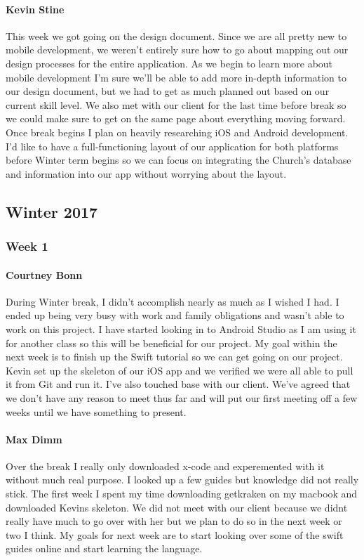 \documentclass[letterpaper,10pt,draftclsnofoot,onecolumn,titlepage]{IEEEtran}
\begin{document}
			\paragraph{Kevin Stine}
			This week we got going on the design document. Since we are all pretty new to mobile development, we weren't entirely sure how to go about mapping out our design processes for the entire application. As we begin to learn more about mobile development I'm sure we'll be able to add more in-depth information to our design document, but we had to get as much planned out based on our current skill level. We also met with our client for the last time before break so we could make sure to get on the same page about everything moving forward. Once break begins I plan on heavily researching iOS and Android development. I'd like to have a full-functioning layout of our application for both platforms before Winter term begins so we can focus on integrating the Church's database and information into our app without worrying about the layout.
		
	\subsection{Winter 2017}
	
		\subsubsection{Week 1}
		
			\paragraph{Courtney Bonn}
			During Winter break, I didn't accomplish nearly as much as I wished I had. I ended up being very busy with work and family obligations and wasn't able to work on this project. I have started looking in to Android Studio as I am using it for another class so this will be beneficial for our project. My goal within the next week is to finish up the Swift tutorial so we can get going on our project. Kevin set up the skeleton of our iOS app and we verified we were all able to pull it from Git and run it. I've also touched base with our client. We've agreed that we don't have any reason to meet thus far and will put our first meeting off a few weeks until we have something to present.

			\paragraph{Max Dimm}
			Over the break I really only downloaded x-code and experemented with it without much real purpose. I looked up a few guides but knowledge did not really stick. The first week I spent my time downloading getkraken on my macbook and downloaded Kevins skeleton. We did not meet with our client because we didnt really have much to go over with her but we plan to do so in the next week or two I think. My goals for next week are to start looking over some of the swift guides online and start learning the language.
			
\end{document}
